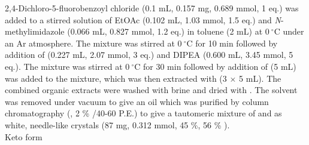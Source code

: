 {{{{{{{{{{{{{{{{{{{{{{{{{{{{{2,4-Dichloro-5-fluorobenzoyl chloride (0.1 mL, 0.157 mg, 0.689 mmol, 1 eq.) was added to a stirred solution of EtOAc (0.102 mL, 1.03 mmol, 1.5 eq.) and \textit{N}-methylimidazole (0.066 mL, 0.827 mmol, 1.2 eq.) in toluene (2 mL) at $0\ ^{\circ}$C under an Ar atmosphere. The mixture was stirred at $0\ ^{\circ}$C for 10 min followed by addition of  (0.227 mL, 2.07 mmol, 3 eq.) and DIPEA (0.600 mL, 3.45 mmol, 5 eq.). The mixture was stirred at $0\ ^{\circ}$C for 30 min followed by addition of  (5 mL) was added to the mixture, which was then extracted with  (3 $\times$ 5 mL). The combined organic extracts were washed with brine and dried with . The solvent was removed under vacuum to give an oil which was purified by column chromatography (, 2 \% /40-60 P.E.) to give a tautomeric mixture of  and  as white, needle-like crystals (87 mg, 0.312 mmol, 45 \%, 56 \% ).%
\\[1\baselineskip]
Keto form 
\\[1\baselineskip]
\\[1\baselineskip]
\\[1\baselineskip]
}}}}}}}}}}}}}}}}}}}}}}}}}}}}}

